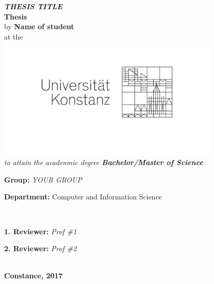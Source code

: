 
\begin{titlepage}
	\begin{center}
		{\Large \textbf{\textit{THESIS TITLE}}}
		\\[2.5cm]
		{\Large \textbf{Thesis}}
		\\[1cm]
		{\Large by}		{\LARGE \textbf{Name of student}}  
		\\[0.5cm]
		{\Large at the}
		\\
		\includegraphics[width=0.8\textwidth]{figures/unisignet.pdf}
		\\[-1cm]		
		\textit{to attain the acadenmic degree \textbf{Bachelor/Master of Science}}
		\\[1cm]
		\begin{minipage}[c]{\textwidth}
			\begin{description}[style=multiline]
				\item \hspace{1.5cm} {\Large \textbf{Group:} \textit{YOUR GROUP}}
				\item {\Large \textbf{Department:}  Computer and Information Science}
			\end{description}
		\end{minipage}		
		\\[1cm]		
		\begin{minipage}[c]{0.8\textwidth}
			\begin{description}[style=multiline]
				\item {\Large \textbf{1. Reviewer:} \textit{Prof \#1}}
				\item {\Large \textbf{2. Reviewer:} \textit{Prof \#2}} 
			\end{description}
		\end{minipage}\\[0.4cm]
		\vfill
		{\LARGE \textbf{Constance, 2017}}
	\end{center}
\end{titlepage}


